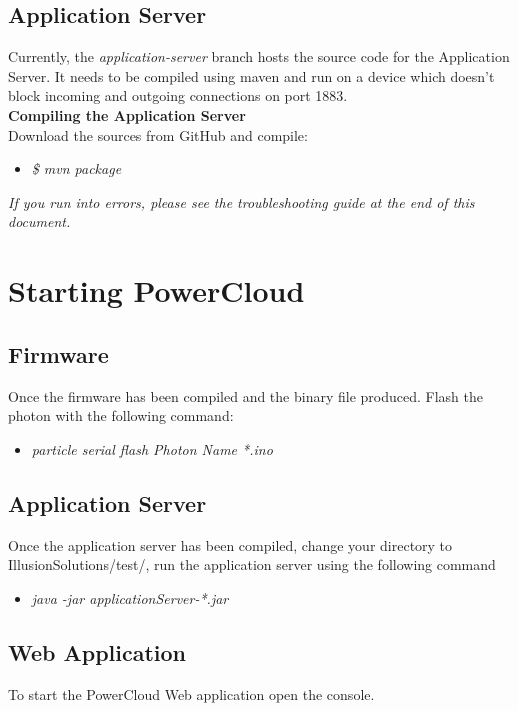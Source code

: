 \documentclass[a4paper,10pt]{article}
\begin{document}
	\subsection{Application Server}
	Currently, the \textit{application-server} branch hosts the source code for 
	the Application Server. It needs to be compiled using maven and run on a 
	device which doesn't block incoming and outgoing connections on port 1883.\\
	
	\textbf{Compiling the Application Server}\\
	Download the sources from GitHub and compile:\\
	
	\begin{itemize}
		\item \textit{\$ mvn package}
	\end{itemize}		
	
	\textit{If you run into errors, please see the troubleshooting guide at the end of this document.}
	
	\newpage
	\section{Starting PowerCloud}
	\subsection{Firmware}
	Once the firmware has been compiled and the binary file produced. Flash the photon with the following command:
	
	\begin{itemize}
		\item \textit{particle serial flash Photon Name *.ino}
	\end{itemize}
	
	\subsection{Application Server}
	Once the application server has been compiled, change your directory to IllusionSolutions/test/, run the application server using the following command
	
	\begin{itemize}
		\item \textit{java -jar applicationServer-*.jar}
	\end{itemize}
	
	\subsection{Web Application}
	To start the PowerCloud Web application open the console.
	
\end{document}
